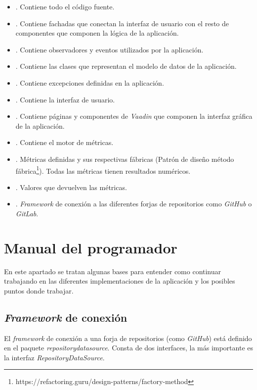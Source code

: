 \begin{itemize}
	\item {}. Contiene todo el código fuente.
	\item {}. Contiene fachadas que conectan la interfaz de usuario con el resto de componentes que componen la lógica de la aplicación.
	\item {}. Contiene observadores y eventos utilizados por la aplicación.
	\item {}. Contiene las clases que representan el modelo de datos de la aplicación.
	\item {}. Contiene excepciones definidas en la aplicación.
	\item {}. Contiene la interfaz de usuario.
	\item {}. Contiene páginas y componentes de \textit{Vaadin} que componen la interfaz gráfica de la aplicación.
	\item {}. Contiene el motor de métricas.
	\item {}. Métricas definidas y sus respectivas fábricas (Patrón de diseño método fábrica\footnote{https://refactoring.guru/design-patterns/factory-method}). Todas las métricas tienen resultados numéricos.
	\item {}. Valores que devuelven las métricas.
	\item {}. \textit{Framework} de conexión a las diferentes forjas de repositorios como \textit{GitHub} o \textit{GitLab}.
\end{itemize}

\section{Manual del programador}
En este apartado se tratan algunas bases para entender como continuar trabajando en las diferentes implementaciones de la aplicación y los posibles puntos donde trabajar.

\subsection{\textit{Framework} de conexión}
El \textit{framework} de conexión a una forja de repositorios (como \textit{GitHub}) está definido en el paquete \textit{repositorydatasource}. Consta de dos interfaces, la más importante es la interfaz \textit{RepositoryDataSource}.

